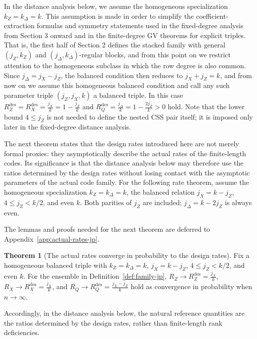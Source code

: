 \documentclass[11pt]{article}
\theoremstyle{definition}
\newtheorem{theorem}{Theorem}[section]
\begin{document}
In the distance analysis below, we assume the homogeneous specialization \(k_Z=k_\Delta=k\).
This assumption is made in order to simplify the coefficient-extraction formulas and symmetry statements used in the fixed-degree analysis from Section 3 onward and in the finite-degree GV theorems for explicit triples.
That is, the first half of Section 2 defines the stacked family with general \((j_Z,k_Z)\) and \((j_\Delta,k_\Delta)\)-regular blocks, and from this point on we restrict attention to the homogeneous subclass in which the row degree is also common.
Since \(j_\Delta=j_X-j_Z\), the balanced condition then reduces to \(j_X+j_Z=k\),
and from now on we assume this homogeneous balanced condition and call any such parameter triple \((j_Z,j_X,k)\) a balanced triple. In this case
\(R_Z^{\mathrm{des}}=R_X^{\mathrm{des}}=\frac{j_X}{k}=1-\frac{j_Z}{k}\)
and
\(R_Q^{\mathrm{des}}=\frac{j_\Delta}{k}=1-\frac{2j_Z}{k}>0\)
hold.
Note that the lower bound \(4\le j_Z\) is not needed to define the nested CSS pair itself; it is imposed only later in the fixed-degree distance analysis.

The next theorem states that the design rates introduced here are not merely formal proxies: they asymptotically describe the actual rates of the finite-length codes.
Its significance is that the distance analysis below may therefore use the ratios determined by the design rates without losing contact with the asymptotic parameters of the actual code family.
For the following rate theorem, assume the homogeneous specialization \(k_Z=k_\Delta=k\), the balanced relation \(j_X=k-j_Z\), \(4\le j_Z<k/2\), and even \(k\). Both parities of \(j_Z\) are included; \(j_\Delta=k-2j_Z\) is always even.

The lemmas and proofs needed for the next theorem are deferred to Appendix~\ref{app:actual-rates-jp}.

\begin{theorem}[The actual rates converge in probability to the design rates]\label{thm:actual-rates-jp}
Fix a homogeneous balanced triple with \(k_Z=k_\Delta=k\),
\(j_X=k-j_Z\), \(4\le j_Z<k/2\), and even \(k\).
For the ensemble in Definition~\ref{def:family-jp},
\(R_Z \to R_Z^{\mathrm{des}}=\frac{j_X}{k}\), \(R_X \to R_X^{\mathrm{des}}=\frac{j_X}{k}\), and \(R_Q \to R_Q^{\mathrm{des}}=\frac{j_X-j_Z}{k}\) hold as convergence in probability when \(n\to\infty\).
\end{theorem}

Accordingly, in the distance analysis below, the natural reference quantities are the ratios determined by the design rates, rather than finite-length rank deficiencies.
\end{document}
